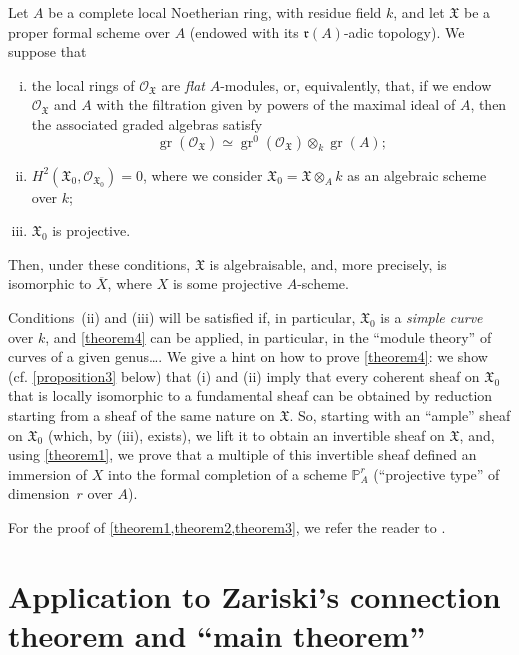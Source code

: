 \documentclass{article}
\theoremstyle{plain}
\newenvironment{theorem}[1]
  {\renewcommand\theinnercustomtheorem{#1}\innercustomtheorem}
  {\endinnercustomtheorem}
\theoremstyle{definition}
\newcommand{\sh}[1]{{\mathscr{#1}}}
\newcommand{\fk}{\mathfrak}
\newcommand{\PP}{\mathbb{P}}
\DeclareMathOperator{\gr}{gr}
\newcommand{\oldpage}[1]{\marginpar{\footnotesize$\Big\vert$ \textit{p.~#1}}}
\begin{document}
\begin{theorem}{4}
\label{theorem4}
  Let $A$ be a complete local Noetherian ring, with residue field $k$, and let $\fk{X}$ be a proper formal scheme over $A$ (endowed with its $\mathfrak{r}(A)$-adic topology).
  We suppose that
  \begin{enumerate}[i.]
    \item the local rings of $\sh{O}_{\fk{X}}$ are \emph{flat} $A$-modules, or, equivalently, that, if we endow $\sh{O}_{\fk{X}}$ and $A$ with the filtration given by powers of the maximal ideal of $A$, then the associated graded algebras satisfy
      \[
        \gr(\sh{O}_{\fk{X}}) \simeq \gr^0(\sh{O}_{\fk{X}})\otimes_k\gr(A);
      \]
    \item $H^2(\fk{X}_0,\sh{O}_{\fk{X}_0})=0$, where we consider $\fk{X}_0=\fk{X}\otimes_Ak$ as an algebraic scheme over $k$;
\oldpage{182-07}
    \item $\fk{X}_0$ is projective.
  \end{enumerate}
  Then, under these conditions, $\fk{X}$ is algebraisable, and, more precisely, is isomorphic to $\overline{X}$, where $X$ is some projective $A$-scheme.
\end{theorem}

Conditions~(ii) and (iii) will be satisfied if, in particular, $\fk{X}_0$ is a \emph{simple curve} over $k$, and \cref{theorem4} can be applied, in particular, in the ``module theory'' of curves of a given genus\ldots.
We give a hint on how to prove \cref{theorem4}:
we show (cf. \cref{proposition3} below) that (i) and (ii) imply that every coherent sheaf on $\fk{X}_0$ that is locally isomorphic to a fundamental sheaf can be obtained by reduction starting from a sheaf of the same nature on $\fk{X}$.
So, starting with an ``ample'' sheaf on $\fk{X}_0$ (which, by (iii), exists), we lift it to obtain an invertible sheaf on $\fk{X}$, and, using \cref{theorem1}, we prove that a multiple of this invertible sheaf defined an immersion of $X$ into the formal completion of a scheme $\PP_A^r$ (``projective type'' of dimension~$r$ over $A$).

For the proof of \cref{theorem1,theorem2,theorem3}, we refer the reader to \cite{1}.


\section{Application to Zariski's connection theorem and ``main theorem''}
\label{section4}
\end{document}

